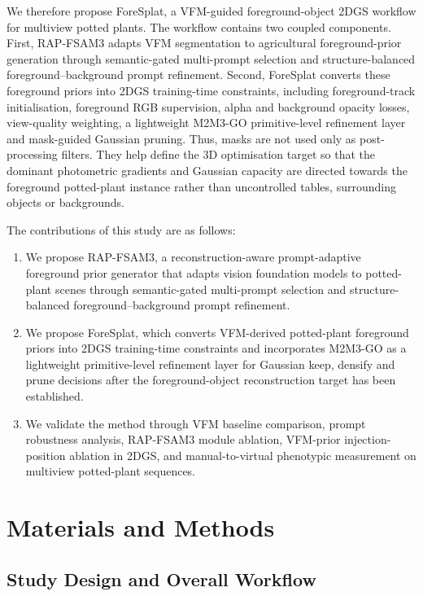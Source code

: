 \documentclass[a4paper]{cas-sc}
\begin{document}
We therefore propose ForeSplat, a VFM-guided foreground-object 2DGS workflow for multiview potted plants. The workflow contains two coupled components. First, RAP-FSAM3 adapts VFM segmentation to agricultural foreground-prior generation through semantic-gated multi-prompt selection and structure-balanced foreground--background prompt refinement. Second, ForeSplat converts these foreground priors into 2DGS training-time constraints, including foreground-track initialisation, foreground RGB supervision, alpha and background opacity losses, view-quality weighting, a lightweight M2M3-GO primitive-level refinement layer and mask-guided Gaussian pruning. Thus, masks are not used only as post-processing filters. They help define the 3D optimisation target so that the dominant photometric gradients and Gaussian capacity are directed towards the foreground potted-plant instance rather than uncontrolled tables, surrounding objects or backgrounds.

The contributions of this study are as follows:

\begin{enumerate}
\item We propose RAP-FSAM3, a reconstruction-aware prompt-adaptive foreground prior generator that adapts vision foundation models to potted-plant scenes through semantic-gated multi-prompt selection and structure-balanced foreground--background prompt refinement.
\item We propose ForeSplat, which converts VFM-derived potted-plant foreground priors into 2DGS training-time constraints and incorporates M2M3-GO as a lightweight primitive-level refinement layer for Gaussian keep, densify and prune decisions after the foreground-object reconstruction target has been established.
\item We validate the method through VFM baseline comparison, prompt robustness analysis, RAP-FSAM3 module ablation, VFM-prior injection-position ablation in 2DGS, and manual-to-virtual phenotypic measurement on multiview potted-plant sequences.
\end{enumerate}

\section{Materials and Methods}\label{sec:materials-and-methods}

\subsection{Study Design and Overall Workflow}\label{sec:study-design-and-overall-workflow}
\end{document}
